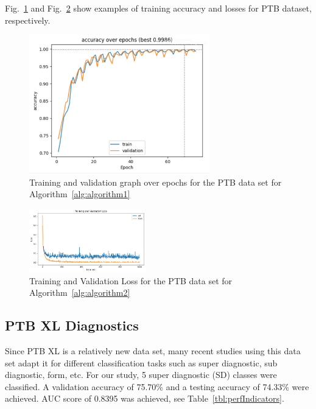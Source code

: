 \documentclass{ieeeaccess}
\begin{document}
Fig.~\ref{fig:trainigValidationGraph} and Fig.~\ref{fig:trainingAndValidationLossAttentionModel} show examples of training accuracy and losses for PTB dataset, respectively.
\begin{figure}[!ht]	
\caption{Training and validation graph over epochs for the PTB data set for Algorithm~\ref{alg:algorithm1}}
\label{fig:trainigValidationGraph}
\centerline{\includegraphics[width=18.5pc]{Definitions/PTB_training.png}}
\end{figure}


\begin{figure}[!ht] %
\includegraphics[width=0.45\textwidth]{Images/TrainingValidationLossAttention}
\caption{Training and Validation Loss for the PTB data set for Algorithm~\ref{alg:algorithm2}}
\label{fig:trainingAndValidationLossAttentionModel}
\end{figure}    

\subsection{PTB XL Diagnostics}
Since PTB XL is a relatively new data set, many recent studies using this data set adapt it for different classification tasks such as super diagnostic, sub diagnostic, form, etc. For our study, 5 super diagnostic (SD) classes were classified. A validation accuracy of 75.70\% and a testing accuracy of 74.33\% were achieved. AUC score of 0.8395 was achieved, see Table~\ref{tbl:perfIndicators}. 
\end{document}
